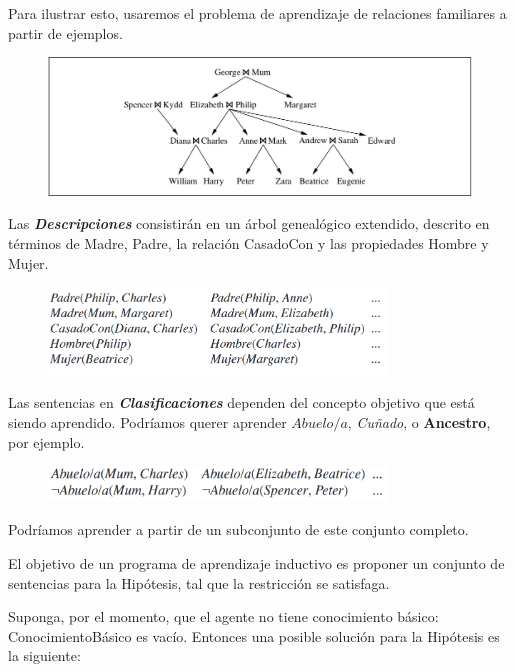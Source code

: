 \documentclass[12 pt, a4paper]{article}
\begin{document}
	 		Para ilustrar esto, usaremos el problema de aprendizaje de relaciones familiares a partir de ejemplos.
	 		\begin{figure}[h]
					\centering
					\includegraphics[width=1\textwidth]{./section3/fig3.png}
				\end{figure}
			Las \textbf{\textit{Descripciones}} consistirán en un árbol genealógico extendido, descrito en términos de Madre, Padre, la relación CasadoCon y las propiedades Hombre y Mujer. 	
				\begin{figure}[h]
					\centering
					\includegraphics[width=0.8\textwidth]{./section3/fig4.png}
				\end{figure}
			Las sentencias en \textbf{\textit{Clasificaciones}} dependen del concepto objetivo que está siendo aprendido. 
Podríamos querer aprender $Abuelo/a$, \textit{Cuñado}, o \textbf{Ancestro}, por ejemplo. 
				\begin{figure}[h]
					\centering
					\includegraphics[width=0.8\textwidth]{./section3/fig5.png}
				\end{figure}
			Podríamos aprender a partir de un subconjunto de este conjunto completo.
	
			El objetivo de un programa de aprendizaje inductivo es proponer un conjunto de sentencias para la Hipótesis, tal que la restricción se satisfaga. 
			
			Suponga, por el momento, que el agente no tiene conocimiento básico: ConocimientoBásico es vacío. Entonces una posible solución para la Hipótesis es la siguiente:
\end{document}
